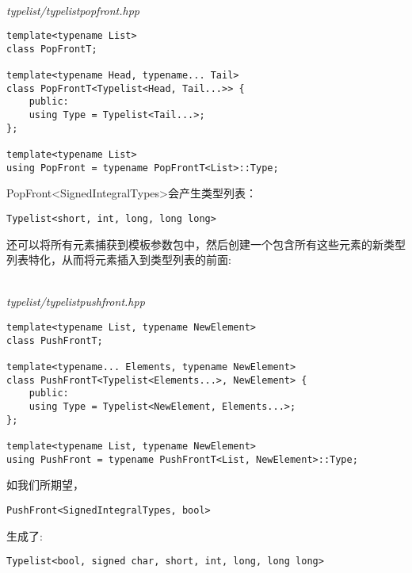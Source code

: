 \hspace*{\fill} \\ %
\noindent
\textit{typelist/typelistpopfront.hpp}
\begin{lstlisting}[style=styleCXX]
template<typename List>
class PopFrontT;

template<typename Head, typename... Tail>
class PopFrontT<Typelist<Head, Tail...>> {
	public:
	using Type = Typelist<Tail...>;
};

template<typename List>
using PopFront = typename PopFrontT<List>::Type;
\end{lstlisting}

PopFront<SignedIntegralTypes>会产生类型列表：

\begin{lstlisting}[style=styleCXX]
Typelist<short, int, long, long long>
\end{lstlisting}

还可以将所有元素捕获到模板参数包中，然后创建一个包含所有这些元素的新类型列表特化，从而将元素插入到类型列表的前面:

\hspace*{\fill} \\ %
\noindent
\textit{typelist/typelistpushfront.hpp}
\begin{lstlisting}[style=styleCXX]
template<typename List, typename NewElement>
class PushFrontT;

template<typename... Elements, typename NewElement>
class PushFrontT<Typelist<Elements...>, NewElement> {
	public:
	using Type = Typelist<NewElement, Elements...>;
};

template<typename List, typename NewElement>
using PushFront = typename PushFrontT<List, NewElement>::Type;
\end{lstlisting}

如我们所期望，

\begin{lstlisting}[style=styleCXX]
PushFront<SignedIntegralTypes, bool>
\end{lstlisting}

生成了:

\begin{lstlisting}[style=styleCXX]
Typelist<bool, signed char, short, int, long, long long>
\end{lstlisting}










